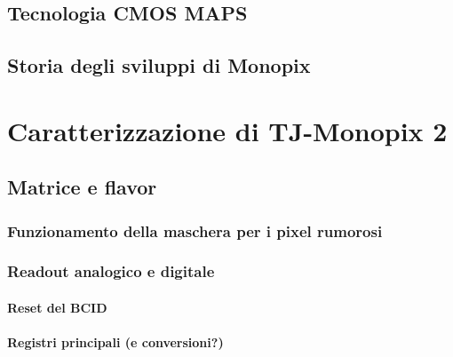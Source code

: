 \documentclass[10pt,a4paper,twoside]{report}
\begin{document}
\section{Tecnologia CMOS MAPS}

\begin{comment}
small fill factor /large fill factor
\end{comment}

\section{Storia degli sviluppi di Monopix}




\chapter{Caratterizzazione di TJ-Monopix 2}

\section{Matrice e flavor}

\subsection{Funzionamento della maschera per i pixel rumorosi}

\subsection{Readout analogico e digitale}

\subsubsection{Reset del BCID}
\begin{comment}
REFERENZE
\end{comment}

\subsubsection{Registri principali (e conversioni?)}
\end{document}
